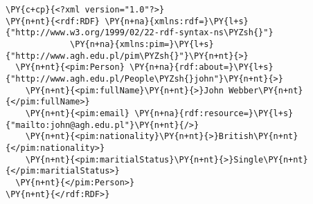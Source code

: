 \begin{Verbatim}[commandchars=\\\{\},frame=single,framerule=0.2pt]
\PY{c+cp}{<?xml version="1.0"?>}
\PY{n+nt}{<rdf:RDF} \PY{n+na}{xmlns:rdf=}\PY{l+s}{"http://www.w3.org/1999/02/22-rdf-syntax-ns\PYZsh{}"}
             \PY{n+na}{xmlns:pim=}\PY{l+s}{"http://www.agh.edu.pl/pim\PYZsh{}"}\PY{n+nt}{>}
  \PY{n+nt}{<pim:Person} \PY{n+na}{rdf:about=}\PY{l+s}{"http://www.agh.edu.pl/People\PYZsh{}john"}\PY{n+nt}{>}
    \PY{n+nt}{<pim:fullName}\PY{n+nt}{>}John Webber\PY{n+nt}{</pim:fullName>}
    \PY{n+nt}{<pim:email} \PY{n+na}{rdf:resource=}\PY{l+s}{"mailto:john@agh.edu.pl"}\PY{n+nt}{/>}
    \PY{n+nt}{<pim:nationality}\PY{n+nt}{>}British\PY{n+nt}{</pim:nationality>} 
    \PY{n+nt}{<pim:maritialStatus}\PY{n+nt}{>}Single\PY{n+nt}{</pim:maritialStatus>}
  \PY{n+nt}{</pim:Person>}
\PY{n+nt}{</rdf:RDF>}
\end{Verbatim}

